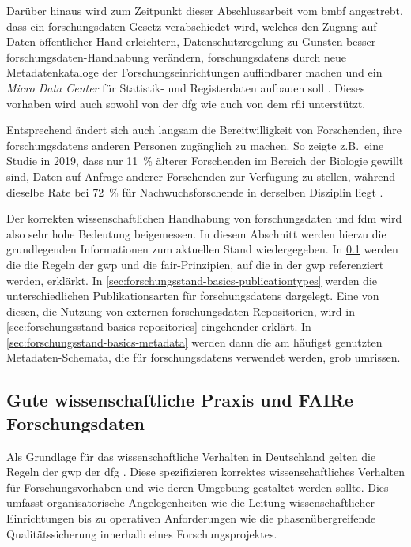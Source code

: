 Darüber hinaus wird zum Zeitpunkt dieser Abschlussarbeit vom \gls{bmbf} angestrebt, dass ein \gls{forschungsdaten}-Gesetz verabschiedet wird, welches den Zugang auf Daten öffentlicher Hand erleichtern, Datenschutzregelung zu Gunsten besser \gls{forschungsdaten}-Handhabung verändern, \glspl{forschungsdaten} durch neue Metadatenkataloge der Forschungseinrichtungen auffindbarer machen und ein \textit{Micro Data Center} für Statistik- und Registerdaten aufbauen soll \autocite{bmbf2024}.
Dieses vorhaben wird auch sowohl von der \gls{dfg} \autocite{dfg2023-gesetz} wie auch von dem \gls{rfii} \autocite{rfii-gesetz} unterstützt.

Entsprechend ändert sich auch langsam die Bereitwilligkeit von Forschenden, ihre \glspl{forschungsdaten} anderen Personen zugänglich zu machen.
So zeigte z.B.~eine Studie in 2019, dass nur \SI{11}{\percent} älterer Forschenden im Bereich der Biologie gewillt sind, Daten auf Anfrage anderer Forschenden zur Verfügung zu stellen, während dieselbe Rate bei \SI{72}{\percent} für Nachwuchsforschende in derselben Disziplin liegt \autocite{Campbell2019}.


Der korrekten wissenschaftlichen Handhabung von \gls{forschungsdaten} und \gls{fdm} wird also sehr hohe Bedeutung beigemessen.
In diesem Abschnitt werden hierzu die grundlegenden Informationen zum aktuellen Stand wiedergegeben.
In \cref{sec:forschungsstand-basics-gwp-fair} werden die die Regeln der \gls{gwp} und die \gls{fair}-Prinzipien, auf die in der \gls{gwp} referenziert werden, erklärkt.
In \cref{sec:forschungsstand-basics-publicationtypes} werden die unterschiedlichen Publikationsarten für \glspl{forschungsdaten} dargelegt.
Eine von diesen, die Nutzung von externen \gls{forschungsdaten}-Repositorien, wird in \cref{sec:forschungsstand-basics-repositories} eingehender erklärt.
In \cref{sec:forschungsstand-basics-metadata} werden dann die am häufigst genutzten Metadaten-Schemata, die für \glspl{forschungsdaten} verwendet werden, grob umrissen.

\subsection{Gute wissenschaftliche Praxis und
FAIRe Forschungsdaten}\label{sec:forschungsstand-basics-gwp-fair}
Als Grundlage für das wissenschaftliche Verhalten in Deutschland gelten die Regeln der \gls{gwp} der \gls{dfg} \autocite{dfg-gwp}.
Diese spezifizieren korrektes wissenschaftliches Verhalten für Forschungsvorhaben und wie deren Umgebung gestaltet werden sollte.
Dies umfasst organisatorische Angelegenheiten wie die Leitung wissenschaftlicher Einrichtungen bis zu operativen Anforderungen wie die phasenübergreifende Qualitätssicherung innerhalb eines Forschungsprojektes.


